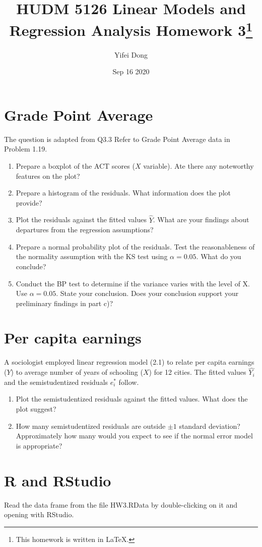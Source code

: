 \documentclass{article}
\title{HUDM 5126 Linear Models and Regression Analysis Homework 3\footnote{This homework is written in \LaTeX.}}
\author{Yifei Dong}
\date{Sep 16 2020}
\begin{document}
\maketitle

\section{Grade Point Average}
The question is adapted from Q3.3 Refer to Grade Point Average data in Problem 1.19.
\begin{enumerate}[label=(\alph*)]
\item Prepare a boxplot of the ACT scores ($X$ variable). Ate there any noteworthy features on the plot?

\item Prepare a histogram of the residuals. What information does the plot provide?

\item Plot the residuals against the fitted values $\widehat{Y}$. What are your findings about departures from the regression assumptions?

\item Prepare a normal probability plot of the residuals. Test the reasonableness of the normality assumption with the KS test using $\alpha=0.05$. What do you conclude?

\item Conduct the BP test to determine if the variance varies with the level of X. Use $\alpha=0.05$. State your conclusion. Does your conclusion support your preliminary findings in part c)?

\end{enumerate}

\section{Per capita earnings}
A sociologist employed linear regression model (2.1) to relate per capita earnings ($Y$) to average number of years of schooling ($X$) for 12 cities. The fitted values $\widehat{Y_{i}}$ and the semistudentized residuals $e^*_{i}$ follow.

\begin{enumerate}[label=(\alph*)]

\item Plot the semistudentized residuals against the fitted values. What does the plot suggest?

\item How many semistudentized residuals are outside $\pm 1$ standard deviation? Approximately how many would you expect to see if the normal error model is appropriate?

\end{enumerate}

\section{R and RStudio}

Read the data frame from the file HW3.RData by double-clicking on it and opening with RStudio.
\end{document}

